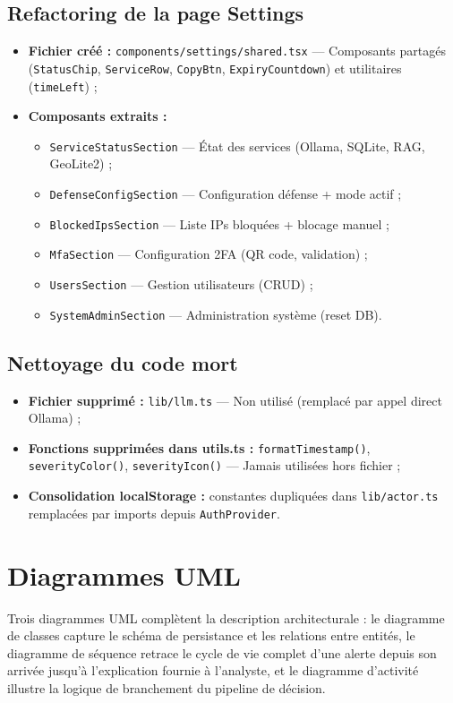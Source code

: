 \documentclass[12pt,a4paper]{report}
\begin{document}
\begin{onehalfspace}
\subsection*{Refactoring de la page Settings}
\begin{itemize}
  \item[\ding{43}] \textbf{Fichier créé :} \texttt{components/settings/shared.tsx}
  — Composants partagés (\texttt{StatusChip}, \texttt{ServiceRow},
  \texttt{CopyBtn}, \texttt{ExpiryCountdown}) et utilitaires (\texttt{timeLeft}) ;
  \item[\ding{43}] \textbf{Composants extraits :}
  \begin{itemize}
    \item \texttt{ServiceStatusSection} — État des services (Ollama, SQLite, RAG, GeoLite2) ;
    \item \texttt{DefenseConfigSection} — Configuration défense + mode actif ;
    \item \texttt{BlockedIpsSection} — Liste IPs bloquées + blocage manuel ;
    \item \texttt{MfaSection} — Configuration 2FA (QR code, validation) ;
    \item \texttt{UsersSection} — Gestion utilisateurs (CRUD) ;
    \item \texttt{SystemAdminSection} — Administration système (reset DB).
  \end{itemize}
\end{itemize}

\subsection*{Nettoyage du code mort}
\begin{itemize}
  \item[\ding{43}] \textbf{Fichier supprimé :} \texttt{lib/llm.ts} — Non utilisé
  (remplacé par appel direct Ollama) ;
  \item[\ding{43}] \textbf{Fonctions supprimées dans utils.ts :}
  \texttt{formatTimestamp()}, \texttt{severityColor()}, \texttt{severityIcon()}
  — Jamais utilisées hors fichier ;
  \item[\ding{43}] \textbf{Consolidation localStorage :} constantes dupliquées
  dans \texttt{lib/actor.ts} remplacées par imports depuis \texttt{AuthProvider}.
\end{itemize}
\end{onehalfspace}

\section{Diagrammes UML}
\begin{onehalfspace}
Trois diagrammes UML complètent la description architecturale : le diagramme
de classes capture le schéma de persistance et les relations entre entités,
le diagramme de séquence retrace le cycle de vie complet d'une alerte depuis
son arrivée jusqu'à l'explication fournie à l'analyste, et le diagramme
d'activité illustre la logique de branchement du pipeline de décision.
\end{onehalfspace}
\end{document}
